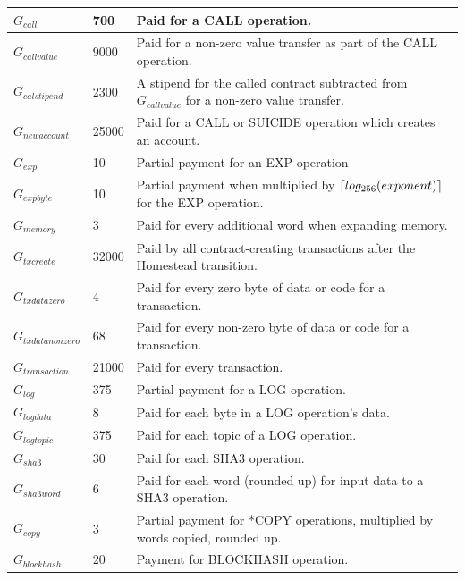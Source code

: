 \documentclass{article}
\DeclarePairedDelimiter{\ceil}{\lceil}{\rceil}
\begin{document}
\begin{table}[h!]
\begin{tabular}{| l | l | p{8cm} |}
			$G_{call}$ 			& 700		& Paid for a CALL operation. \\ \hline
			$G_{callvalue}$ 	& 9000		& Paid for a non-zero value transfer as part of the CALL operation. \\ \hline
			$G_{calstipend}$ 	& 2300		& A stipend for the called contract subtracted from $G_{callvalue}$ for a non-zero value transfer. \\ \hline
			$G_{newaccount}$ 	& 25000		& Paid for a CALL or SUICIDE operation which creates an account. \\ \hline
			$G_{exp}$ 			& 10 		& Partial payment for an EXP operation \\ \hline
			$G_{expbyte}$ 		& 10		& Partial payment when multiplied by $\ceil{log_{256}(exponent)}$  for the EXP operation. 	 \\ \hline
			$G_{memory}$ 		& 3			& Paid for every additional word when expanding memory. \\ \hline
			$G_{txcreate}$ 		& 32000		& Paid by all contract-creating transactions after the Homestead transition. \\ \hline
			$G_{txdatazero}$ 	& 4 		& Paid for every zero byte of data or code for a transaction. \\ \hline
			$G_{txdatanonzero}$ & 68		& Paid for every non-zero byte of data or code for a transaction. \\ \hline
			$G_{transaction}$ 	& 21000		& Paid for every transaction. \\ \hline
			$G_{log}$ 			& 375 		& Partial payment for a LOG operation. \\ \hline
			$G_{logdata}$ 		& 8			& Paid for each byte in a LOG operation's data. \\ \hline
			$G_{logtopic}$ 		& 375		& Paid for each topic of a LOG operation. \\ \hline
			$G_{sha3}$ 			& 30		& Paid for each SHA3 operation. \\ \hline
			$G_{sha3word}$ 		& 6			& Paid for each word (rounded up) for input data to a SHA3 operation. \\ \hline
			$G_{copy}$ 			& 3			& Partial payment for *COPY operations, multiplied by words copied, rounded up. \\ \hline
			$G_{blockhash}$ 	& 20		& Payment for BLOCKHASH operation. \\ 
			\hline
		\end{tabular}
		\end{table}
		\FloatBarrier
\end{document}
